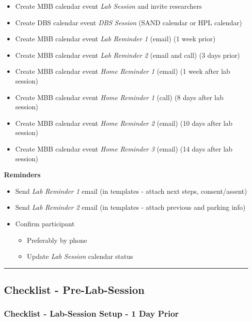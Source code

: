 \documentclass[]{book}
\providecommand{\tightlist}{%
  \setlength{\itemsep}{0pt}\setlength{\parskip}{0pt}}
\begin{document}
\begin{itemize}
\tightlist
\item
  Create MBB calendar event \emph{Lab Session} and invite researchers
\item
  Create DBS calendar event \emph{DBS Session} (SAND calendar or HPL calendar)
\item
  Create MBB calendar event \emph{Lab Reminder 1} (email) (1 week prior)
\item
  Create MBB calendar event \emph{Lab Reminder 2} (email and call) (3 days prior)
\item
  Create MBB calendar event \emph{Home Reminder 1} (email) (1 week after lab session)
\item
  Create MBB calendar event \emph{Home Reminder 1} (call) (8 days after lab session)
\item
  Create MBB calendar event \emph{Home Reminder 2} (email) (10 days after lab session)
\item
  Create MBB calendar event \emph{Home Reminder 3} (email) (14 days after lab session)
\end{itemize}

\textbf{Reminders}

\begin{itemize}
\tightlist
\item
  Send \emph{Lab Reminder 1} email (in templates - attach next steps, consent/assent)
\item
  Send \emph{Lab Reminder 2} email (in templates - attach previous and parking info)
\item
  Confirm participant

  \begin{itemize}
  \tightlist
  \item
    Preferably by phone
  \item
    Update \emph{Lab Session} calendar status
  \end{itemize}
\end{itemize}

\begin{center}\rule{0.5\linewidth}{0.5pt}\end{center}

\hypertarget{checklist---pre-lab-session}{%
\subsection{Checklist - Pre-Lab-Session}\label{checklist---pre-lab-session}}

\hypertarget{checklist---lab-session-setup---1-day-prior}{%
\subsubsection{Checklist - Lab-Session Setup - 1 Day Prior}\label{checklist---lab-session-setup---1-day-prior}}
\end{document}

